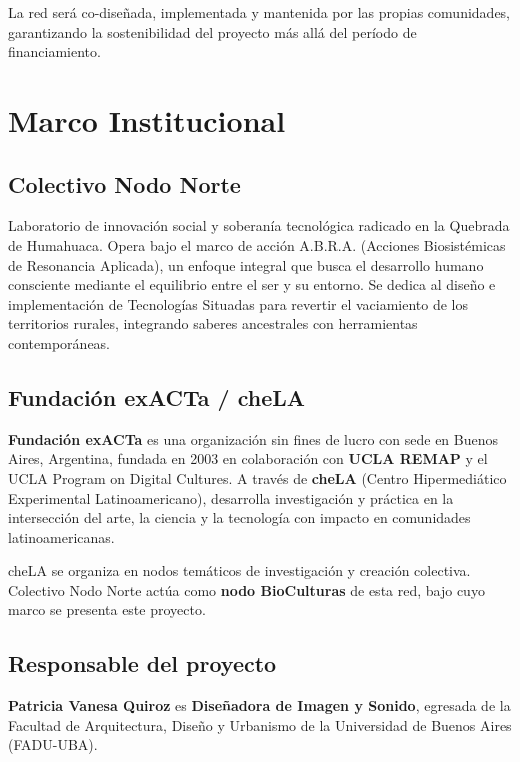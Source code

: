 \documentclass[12pt,a4paper]{article}
\begin{document}
La red será co-diseñada, implementada y mantenida por las propias comunidades, garantizando la sostenibilidad del proyecto más allá del período de financiamiento.

\section{Marco Institucional}

\subsection{Colectivo Nodo Norte}

Laboratorio de innovación social y soberanía tecnológica radicado en la Quebrada de Humahuaca. Opera bajo el marco de acción A.B.R.A. (Acciones Biosistémicas de Resonancia Aplicada), un enfoque integral que busca el desarrollo humano consciente mediante el equilibrio entre el ser y su entorno. Se dedica al diseño e implementación de Tecnologías Situadas para revertir el vaciamiento de los territorios rurales, integrando saberes ancestrales con herramientas contemporáneas.

\subsection{Fundación exACTa / cheLA}

\textbf{Fundación exACTa} es una organización sin fines de lucro con sede en Buenos Aires, Argentina, fundada en 2003 en colaboración con \textbf{UCLA REMAP} y el UCLA Program on Digital Cultures. A través de \textbf{cheLA} (Centro Hipermediático Experimental Latinoamericano), desarrolla investigación y práctica en la intersección del arte, la ciencia y la tecnología con impacto en comunidades latinoamericanas.

cheLA se organiza en nodos temáticos de investigación y creación colectiva. Colectivo Nodo Norte actúa como \textbf{nodo BioCulturas} de esta red, bajo cuyo marco se presenta este proyecto.

\subsection{Responsable del proyecto}

\textbf{Patricia Vanesa Quiroz} es \textbf{Diseñadora de Imagen y Sonido}, egresada de la Facultad de Arquitectura, Diseño y Urbanismo de la Universidad de Buenos Aires (FADU-UBA).
\end{document}

